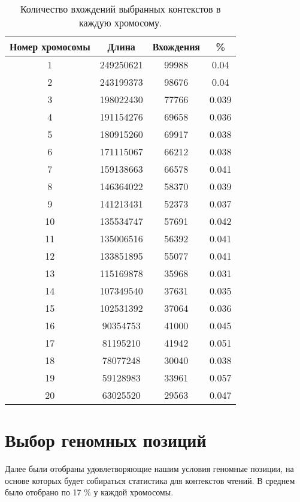 \begin{table}[H]
\begin{center}
\begin{tabular}{|c|c|c|c|}
\hline
Номер хромосомы & Длина & Вхождения & \% \\
\hline
1 & 249250621 &  99988 & 0.04\\
\hline
2 & 243199373 &  98676  & 0.04\\
\hline
3 & 198022430 &  77766  & 0.039\\
\hline
4 & 191154276 &  69658  & 0.036\\
\hline
5 & 180915260 &  69917  & 0.038\\
\hline
6 & 171115067 &  66212  & 0.038\\
\hline
7 & 159138663 &  66578  & 0.041\\
\hline
8 & 146364022 &  58370  & 0.039\\
\hline
9 & 141213431 &  52373  & 0.037\\
\hline
10 & 135534747 &  57691  & 0.042\\
\hline
11 & 135006516 &  56392  & 0.041\\
\hline
12 & 133851895 &  55077  & 0.041\\
\hline
13 & 115169878 &  35968 & 0.031\\
\hline
14 & 107349540 &  37631  & 0.035\\
\hline
15 & 102531392 &  37064  & 0.036\\
\hline
16 & 90354753 &  41000  & 0.045\\
\hline
17 & 81195210 &  41942  & 0.051\\
\hline
18 & 78077248 &  30040  & 0.038\\
\hline
19 & 59128983 &  33961 & 0.057\\
\hline
20 & 63025520 &  29563  & 0.047\\
\hline
\end{tabular}
\end{center}
\captionsetup{justification=centering}
\caption{Количество вхождений выбранных контекстов в каждую хромосому.}
\label{cont_occur}
\end{table} 


\section{Выбор геномных позиций}
\label{genomepos}
	
	Далее были отобраны удовлетворяющие нашим условия геномные позиции, на основе которых будет собираться статистика для контекстов чтений. В среднем было отобрано по 17 \% у каждой хромосомы.

